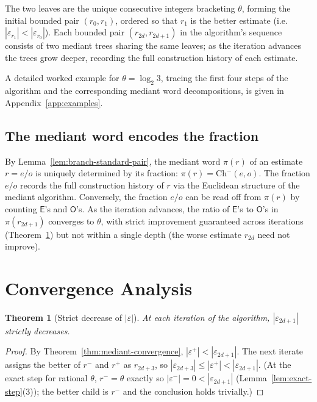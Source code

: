 \documentclass[12pt]{article}
\newtheorem{theorem}{Theorem}[section]
\theoremstyle{definition}
\theoremstyle{remark}
\theoremstyle{plain}
\newcommand{\eps}{\varepsilon}
\newcommand{\OO}{\mathsf{O}}
\newcommand{\EE}{\mathsf{E}}
\newcommand{\rplus}{r^{+}}
\newcommand{\rminus}{r^{-}}
\newcommand{\epsplus}{\eps^{+}}
\begin{document}
The two leaves are the unique consecutive integers bracketing $\theta$,
forming the initial bounded pair $(r_0, r_1)$, ordered so that $r_1$ is the better estimate
(i.e.\ $|\varepsilon_{r_1}| < |\varepsilon_{r_0}|$).
Each bounded pair $(r_{2d}, r_{2d+1})$ in the algorithm's sequence consists of two
mediant trees sharing the same leaves; as the iteration advances the trees grow deeper,
recording the full construction history of each estimate.

A detailed worked example for $\theta = \log_2 3$, tracing the first four steps of the
algorithm and the corresponding mediant word decompositions, is given in
Appendix~\ref{app:examples}.

\subsection{The mediant word encodes the fraction}
\label{sec:parity-encoding}

By Lemma~\ref{lem:branch-standard-pair}, the mediant word $\pi(r)$ of an estimate
$r = e/o$ is uniquely determined by its fraction: $\pi(r) = \mathrm{Ch}^-(e, o)$.
The fraction $e/o$ records the full construction history of $r$ via the Euclidean
structure of the mediant algorithm.
Conversely, the fraction $e/o$ can be read off from $\pi(r)$ by counting $\EE$'s and
$\OO$'s.
As the iteration advances, the ratio of $\EE$'s to $\OO$'s in $\pi(r_{2d+1})$ converges to
$\theta$, with strict improvement guaranteed across iterations
(Theorem~\ref{thm:convergence}) but not within a single depth
(the worse estimate $r_{2d}$ need not improve).

\section{Convergence Analysis}
\label{sec:convergence}

\begin{theorem}[Strict decrease of $|\eps|$]
\label{thm:convergence}
At each iteration of the algorithm, $|\eps_{2d+1}|$ strictly decreases.
\end{theorem}

\begin{proof}
By Theorem~\ref{thm:mediant-convergence}, $|\epsplus| < |\eps_{2d+1}|$.
The next iterate assigns the better of $\rminus$ and $\rplus$ as $r_{2d+3}$, so
$|\eps_{2d+3}| \leq |\epsplus| < |\eps_{2d+1}|$.
(At the exact step for rational $\theta$, $r^- = \theta$ exactly so
$|\eps^-| = 0 < |\eps_{2d+1}|$ (Lemma~\ref{lem:exact-step}(3)); the better
child is $r^-$ and the conclusion holds trivially.)
\end{proof}
\end{document}
